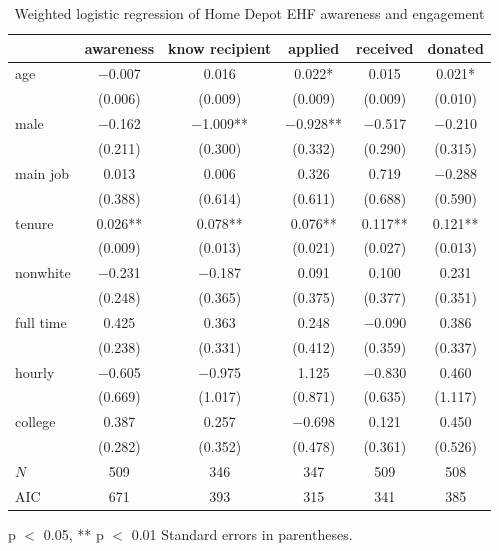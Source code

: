 \documentclass[
  11pt,
  oneside]{article}
\begin{document}
\begin{table}
\centering
\caption{\label{tab:awareness-model}Weighted logistic regression of Home Depot EHF awareness and engagement \label{tab:awareness-model}}
\centering
\begin{threeparttable}
\begin{tabular}[t]{lccccc}
\toprule
  & awareness & know recipient & applied & received & donated\\
\midrule
age & \num{-0.007} & \num{0.016} & \num{0.022}* & \num{0.015} & \num{0.021}*\\
 & (\num{0.006}) & (\num{0.009}) & (\num{0.009}) & (\num{0.009}) & (\num{0.010})\\
male & \num{-0.162} & \num{-1.009}** & \num{-0.928}** & \num{-0.517} & \num{-0.210}\\
 & (\num{0.211}) & (\num{0.300}) & (\num{0.332}) & (\num{0.290}) & (\num{0.315})\\
main job & \num{0.013} & \num{0.006} & \num{0.326} & \num{0.719} & \num{-0.288}\\
 & (\num{0.388}) & (\num{0.614}) & (\num{0.611}) & (\num{0.688}) & (\num{0.590})\\
tenure & \num{0.026}** & \num{0.078}** & \num{0.076}** & \num{0.117}** & \num{0.121}**\\
 & (\num{0.009}) & (\num{0.013}) & (\num{0.021}) & (\num{0.027}) & (\num{0.013})\\
nonwhite & \num{-0.231} & \num{-0.187} & \num{0.091} & \num{0.100} & \num{0.231}\\
 & (\num{0.248}) & (\num{0.365}) & (\num{0.375}) & (\num{0.377}) & (\num{0.351})\\
full time & \num{0.425} & \num{0.363} & \num{0.248} & \num{-0.090} & \num{0.386}\\
 & (\num{0.238}) & (\num{0.331}) & (\num{0.412}) & (\num{0.359}) & (\num{0.337})\\
hourly & \num{-0.605} & \num{-0.975} & \num{1.125} & \num{-0.830} & \num{0.460}\\
 & (\num{0.669}) & (\num{1.017}) & (\num{0.871}) & (\num{0.635}) & (\num{1.117})\\
college & \num{0.387} & \num{0.257} & \num{-0.698} & \num{0.121} & \num{0.450}\\
 & (\num{0.282}) & (\num{0.352}) & (\num{0.478}) & (\num{0.361}) & (\num{0.526})\\
\midrule
$N$ & \num{509} & \num{346} & \num{347} & \num{509} & \num{508}\\
AIC & \num{671} & \num{393} & \num{315} & \num{341} & \num{385}\\
\bottomrule
\end{tabular}
\begin{tablenotes}
\item * p $<$ 0.05, ** p $<$ 0.01 Standard errors in parentheses.
\end{tablenotes}
\end{threeparttable}
\end{table}
\end{document}

